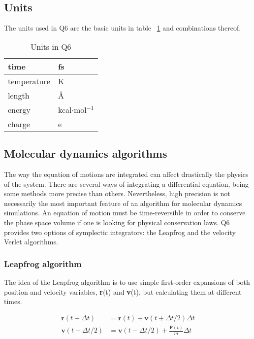 \documentclass[a4paper,11pt]{article}
\let\origref\ref
\def\ref#1{\unskip~\origref{#1}}
\begin{document}
\subsection{Units}
\label{subsec:units}

The units used in Q6 are the basic units in table \ref{tab:units}
and combinations thereof. \small
\begin{table}[h]
\begin{center}
\caption{Units in Q6} \label{tab:units}
\begin{tabular}{|l|l|}
\hline time & fs \\
\hline temperature & K \\
	\hline length & {\AA} \\
\hline energy & kcal$\cdot$mol$^{-1}$ \\
\hline charge & e \\
\hline
\end{tabular}
\end{center}
\end{table} \normalsize

\subsection{Molecular dynamics algorithms}
The way the equation of motions are integrated can affect drastically the 
physics of the system. There are several ways of integrating a differential 
equation, being some methods more precise than others. Nevertheless, 
high precision is not necessarily the most important feature of an algorithm 
for molecular dynamics simulations. An equation of motion must be 
time-reversible in order to conserve the phase space volume if one is looking 
for physical conservation laws. Q6 provides two options of symplectic 
integrators: the Leapfrog and the velocity Verlet algorithms.

\subsubsection{Leapfrog algorithm}
The idea of the Leapfrog algorithm is to use simple first-order expansions of 
both position and velocity variables, \textbf{r}(t) and \textbf{v}(t), but 
calculating them at different times.

\begin{align}
 \textbf{r}(t+\Delta t) &= \textbf{r}(t) + \textbf{v}(t+\Delta t/2) \Delta t \\
 \textbf{v}(t+\Delta t/2) &= \textbf{v}(t-\Delta t/2) + \frac{\textbf{F}(t)}{m}\Delta t
\end{align}
\end{document}

